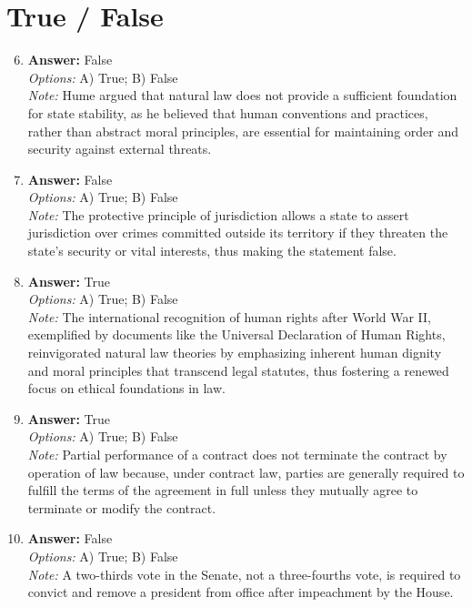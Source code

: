 \documentclass[12pt]{article}
\begin{document}
\section*{True / False}
\begin{enumerate}[label=\arabic*.]
\setcounter{enumi}{5}
\item \textbf{Answer:} False
\\ \textit{Options:} A) True; B) False
\\ \textit{Note:} Hume argued that natural law does not provide a sufficient foundation for state stability, as he believed that human conventions and practices, rather than abstract moral principles, are essential for maintaining order and security against external threats.
\item \textbf{Answer:} False
\\ \textit{Options:} A) True; B) False
\\ \textit{Note:} The protective principle of jurisdiction allows a state to assert jurisdiction over crimes committed outside its territory if they threaten the state's security or vital interests, thus making the statement false.
\item \textbf{Answer:} True
\\ \textit{Options:} A) True; B) False
\\ \textit{Note:} The international recognition of human rights after World War II, exemplified by documents like the Universal Declaration of Human Rights, reinvigorated natural law theories by emphasizing inherent human dignity and moral principles that transcend legal statutes, thus fostering a renewed focus on ethical foundations in law.
\item \textbf{Answer:} True
\\ \textit{Options:} A) True; B) False
\\ \textit{Note:} Partial performance of a contract does not terminate the contract by operation of law because, under contract law, parties are generally required to fulfill the terms of the agreement in full unless they mutually agree to terminate or modify the contract.
\item \textbf{Answer:} False
\\ \textit{Options:} A) True; B) False
\\ \textit{Note:} A two-thirds vote in the Senate, not a three-fourths vote, is required to convict and remove a president from office after impeachment by the House.
\end{enumerate}
\end{document}
